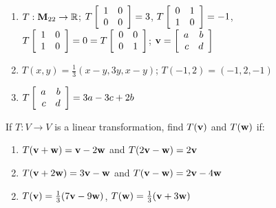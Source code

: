 \begin{multicols}{2}
\begin{ex}
\begin{enumerate}[label={\alph*.}]
\item $T : \textbf{M}_{22} \to \mathbb{R}$; $T\left[ \begin{array}{rr}
1 & 0 \\
0 & 0
\end{array} \right] = 3$, $T\left[ \begin{array}{rr}
	0 & 1 \\
	1 & 0
\end{array} \right] = -1$, $T\left[ \begin{array}{rr}
1 & 0 \\
1 & 0
\end{array} \right] = 0 = T\left[ \begin{array}{rr}
0 & 0 \\
0 & 1
\end{array} \right]$; $\textbf{v} = \left[ \begin{array}{rr}
a & b \\
c & d
\end{array} \right]$


\end{enumerate}
\begin{sol}
\begin{enumerate}[label={\alph*.}]
\setcounter{enumi}{1}
\item  $T(x, y) = \frac{1}{3}(x - y, 3y, x - y)$; $T(-1, 2) = (-1, 2, -1)$

\setcounter{enumi}{3}
\item $T\left[ \begin{array}{rr}
a & b \\
c & d
\end{array} \right] = 3a -3c + 2b$

\end{enumerate}
\end{sol}
\end{ex}

\begin{ex}
If $T : V \to V$ is a linear transformation, find $T(\textbf{v})$ and $T(\textbf{w})$ if:


\begin{enumerate}[label={\alph*.}]
\item $T(\textbf{v} + \textbf{w}) = \textbf{v} - 2\textbf{w}$ and $T(2\textbf{v} - \textbf{w}) = 2\textbf{v}$

\item $T(\textbf{v} + 2\textbf{w}) = 3\textbf{v} - \textbf{w}$ and $T(\textbf{v} - \textbf{w}) = 2\textbf{v} - 4\textbf{w}$

\end{enumerate}
\begin{sol}
\begin{enumerate}[label={\alph*.}]
\setcounter{enumi}{1}
\item $T(\textbf{v}) = \tfrac{1}{3}(7\textbf{v} - 9\textbf{w})$, $T(\textbf{w}) = \tfrac{1}{3}(\textbf{v} + 3\textbf{w})$


\end{enumerate}
\end{sol}
\end{ex}
\end{multicols}
